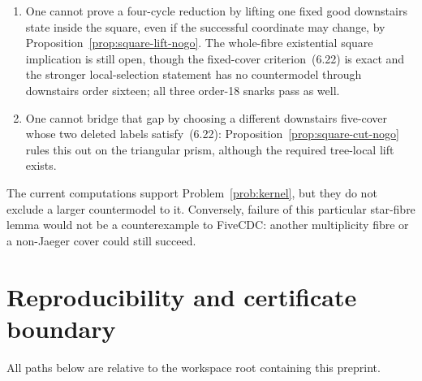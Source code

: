 \documentclass[11pt]{article}
\theoremstyle{definition}
\theoremstyle{remark}
\newcommand{\1}{\mathbf 1}
\begin{document}
\begin{enumerate}
      of one fixed odd-kernel triple: the second order-16 state has no such
      neighbour.  A successful universal descent argument must exploit the
      full same-level component, including active neutral exchanges, and
      must control the simultaneous topology changes in~(8.3).
\item One cannot prove a four-cycle reduction by lifting one fixed good
      downstairs state inside the square, even if the successful coordinate
      may change, by Proposition~\ref{prop:square-lift-nogo}.  The
      whole-fibre existential square implication is still open, though the
      fixed-cover criterion~(6.22) is exact and the stronger local-selection
      statement has no countermodel through downstairs order sixteen;
      all three order-18 snarks pass as well.
\item One cannot bridge that gap by choosing a different downstairs
      five-cover whose two deleted labels satisfy~(6.22):
      Proposition~\ref{prop:square-cut-nogo} rules this out on the
      triangular prism, although the required tree-local lift exists.
\end{enumerate}

The current computations support Problem~\ref{prob:kernel}, but they do not
exclude a larger countermodel to it.  Conversely, failure of this
particular star-fibre lemma would not be a counterexample to FiveCDC:
another multiplicity fibre or a non-Jaeger cover could still succeed.

\section{Reproducibility and certificate boundary}

All paths below are relative to the workspace root containing this
preprint.
\end{document}
